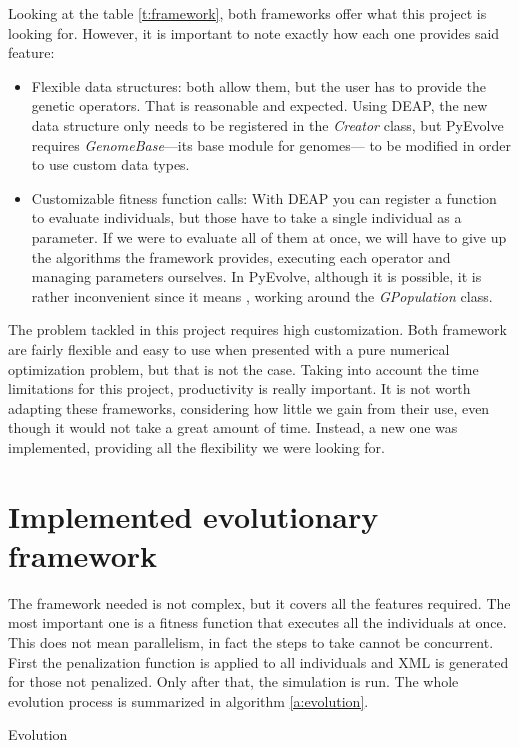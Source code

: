Looking at the table \ref{t:framework}, both frameworks offer what this project is looking for. However, it is important to note exactly how each one provides said feature:

\begin{itemize}
	\item Flexible data structures: both allow them, but the user has to provide the genetic operators. That is reasonable and expected. Using DEAP, the new data structure only needs to be registered in the \textit{Creator} class, but PyEvolve requires \textit{GenomeBase}---its base module for genomes--- to be modified in order to use custom data types.
	\item Customizable fitness function calls: With DEAP you can register a function to evaluate individuals, but those have to take a single individual as a parameter. If we were to evaluate all of them at once, we will have to give up the algorithms the framework provides, executing each operator and managing parameters ourselves. In PyEvolve, although it is possible, it is rather inconvenient since it means , working around the \textit{GPopulation} class.
\end{itemize} 

The problem tackled in this project requires high customization. Both framework are fairly flexible and easy to use when presented with a pure numerical optimization problem, but that is not the case. Taking into account the time limitations for this project, productivity is really important. It is not worth adapting these frameworks, considering how little we gain from their use, even though it would not take a great amount of time. Instead, a new one was implemented, providing all the flexibility we were looking for.

\section{Implemented evolutionary framework}

The framework needed is not complex, but it covers all the features required. The most important one is a fitness function that executes all the individuals at once. This does not mean parallelism, in fact the steps to take cannot be concurrent. First the penalization function is applied to all individuals and XML is generated for those not penalized. Only after that, the simulation is run. The whole evolution process is summarized in algorithm \ref{a:evolution}.
 
\begin{algorithm}
	\caption{Evolution}
	\label{a:evolution}
\end{algorithm}

